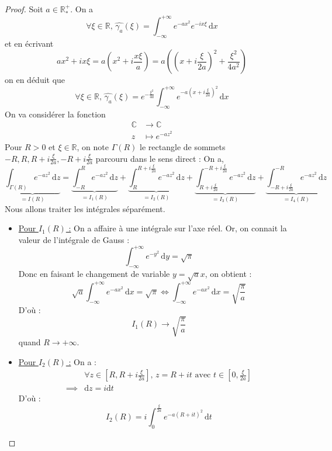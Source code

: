 	\begin{proof}
		Soit $a \in \mathbb{R}^+_*$. On a
		\[ \forall \xi \in \mathbb{R}, \, \widehat{\gamma_a}(\xi) = \int_{-\infty}^{+\infty} e^{-ax^2} e^{-ix\xi} \, \mathrm{d}x \]
		et en écrivant
		\[ ax^2 + ix\xi = a \left( x^2 + i \frac{x \xi}{a} \right) = a \left( \left( x + i \frac{\xi}{2a} \right)^2 + \frac{\xi^2}{4a^2} \right) \]
		on en déduit que
		\[ \forall \xi \in \mathbb{R}, \, \widehat{\gamma_a}(\xi) = e^{-\frac{\xi^2}{4a}} \int_{-\infty}^{+\infty} e^{-a \left( x + i \frac{\xi}{2a} \right)^2} \, \mathrm{d}x \tag{$*$} \]
		On va considérer la fonction
		\[
		\begin{array}{cl}
			\mathbb{C} &\rightarrow \mathbb{C} \\
			z &\mapsto e^{-az^2}
		\end{array}
		\]
		Pour $R > 0$ et $\xi \in \mathbb{R}$, on note $\Gamma(R)$ le rectangle de sommets $-R, R, R + i\frac{\xi}{2a}, -R + i\frac{\xi}{2a}$ parcouru dans le sens direct :
		On a,
		\[ \underbrace{\int_{\Gamma(R)} e^{-az^2} \, \mathrm{d}z}_{= I(R)} = \underbrace{\int_{-R}^R e^{-az^2} \, \mathrm{d}z}_{= I_1(R)} + \underbrace{\int_R^{R + i\frac{\xi}{2a}} e^{-az^2} \, \mathrm{d}z}_{= I_2(R)} + \underbrace{\int_{R + i\frac{\xi}{2a}}^{-R + i\frac{\xi}{2a}} e^{-az^2} \, \mathrm{d}z}_{= I_3(R)} + \underbrace{\int_{-R + i\frac{\xi}{2a}}^{-R} e^{-az^2} \, \mathrm{d}z}_{= I_4(R)} \]
		Nous allons traiter les intégrales séparément.
		\begin{itemize}
			\item \underline{Pour $I_1(R)$ :} On a affaire à une intégrale sur l'axe réel. Or, on connait la valeur de l'intégrale de Gauss :
			\[ \int_{-\infty}^{+\infty} e^{-y^2} \, \mathrm{d}y = \sqrt{\pi} \]
			Donc en faisant le changement de variable $y = \sqrt{a}x$, on obtient :
			\[ \sqrt{a} \int_{-\infty}^{+\infty} e^{-ax^2} \, \mathrm{d}x = \sqrt{\pi} \iff \int_{-\infty}^{+\infty} e^{-ax^2} \, \mathrm{d}x = \sqrt{\frac{\pi}{a}} \]
			D'où :
			\[ I_1(R) \longrightarrow \sqrt{\frac{\pi}{a}} \]
			quand $R \longrightarrow +\infty$.
			\item \underline{Pour $I_2(R)$ :} On a :
			\begin{align*}
				&\forall z \in \left[ R, R + i \frac{\xi}{2a} \right], \, z = R + it \text{ avec $t \in \left[ 0, \frac{\xi}{2a} \right]$} \\
				\implies& \mathrm{d}z = i\mathrm{d}t
			\end{align*}
			D'où :
			\[ I_2(R) = i \int_0^{\frac{\xi}{2a}} e^{-a (R+it)^2} \, \mathrm{d}t \]

\end{itemize}
\end{proof}
